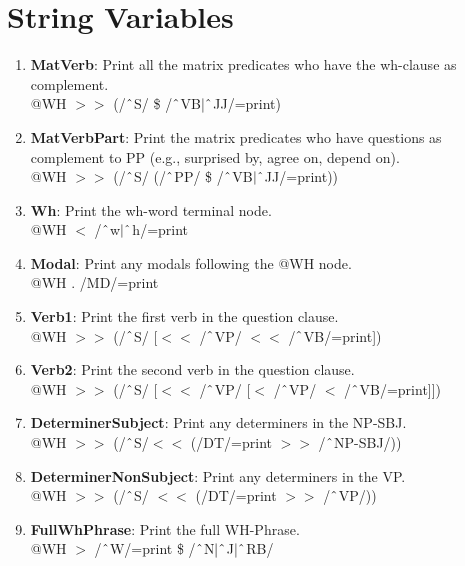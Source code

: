 \section{String Variables}
\begin{enumerate}
    \item \textbf{MatVerb}: Print all the matrix predicates who have the wh-clause as complement.\\
    @WH $>\!\!>$ (/$\string^$S/ \$ /$\string^$VB$|\string^$JJ/=print)

    \item \textbf{MatVerbPart}: Print the matrix predicates who have questions as complement to PP (e.g., \textsf{surprised by}, \textsf{agree on}, \textsf{depend on}).\\
    @WH $>\!\!>$ (/$\string^$S/ (/$\string^$PP/ \$ /$\string^$VB$|\string^$JJ/=print))

    \item \textbf{Wh}: Print the wh-word terminal node.\\
    @WH $<$ /$\string^$w$|\string^$h/=print

    \item \textbf{Modal}: Print any modals following the @WH node.\\
    @WH . /MD/=print

    \item \textbf{Verb1}: Print the first verb in the question clause. \\
    @WH $>\!\!>$ (/$\string^$S/ [$<\!\!<$ /$\string^$VP/ $<\!\!<$ /$\string^$VB/=print])

    \item \textbf{Verb2}: Print the second verb in the question clause.\\
    @WH $>\!\!>$ (/$\string^$S/ [$<\!\!<$ /$\string^$VP/ [$<$ /$\string^$VP/ $<$ /$\string^$VB/=print]])
    
    \item \textbf{DeterminerSubject}: Print any determiners in the NP-SBJ.\\
    @WH $>\!\!>$ (/$\string^$S/$<\!\!<$ (/DT/=print $>\!\!>$ /$\string^$NP-SBJ/))
    
    \item \textbf{DeterminerNonSubject}: Print any determiners in the VP.\\
    @WH $>\!\!>$ (/$\string^$S/ $<\!\!<$ (/DT/=print $>\!\!>$ /$\string^$VP/))

    \item \textbf{FullWhPhrase}: Print the full WH-Phrase.\\
    @WH $>$ /$\string^$W/=print \$ /$\string^$N$|\string^$J$|\string^$RB/


\end{enumerate}
